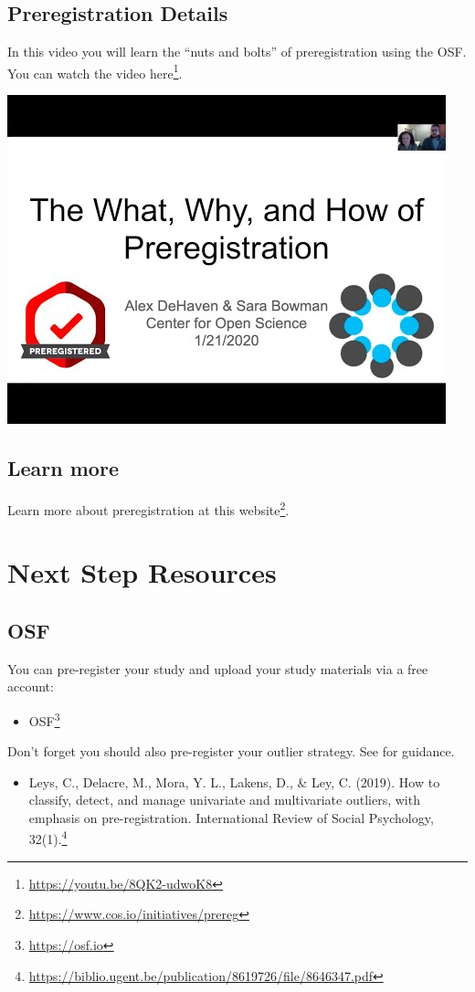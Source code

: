 \documentclass[
]{krantz}
\providecommand{\tightlist}{%
  \setlength{\itemsep}{0pt}\setlength{\parskip}{0pt}}
\renewcommand{\href}[2]{#2\footnote{\url{#1}}}
\begin{document}
\hypertarget{preregistration-details}{%
\section{Preregistration Details}\label{preregistration-details}}

In this video you will learn the ``nuts and bolts'' of preregistration using the OSF. You can watch the video \href{https://youtu.be/8QK2-udwoK8}{here}.

\includegraphics[width=0.4\linewidth]{ch_preregistration/images/prereg_details}

\hypertarget{learn-more}{%
\section{Learn more}\label{learn-more}}

Learn more about preregistration at this \href{https://www.cos.io/initiatives/prereg}{website}.

\hypertarget{next-step-resources}{%
\chapter{Next Step Resources}\label{next-step-resources}}

\hypertarget{osf}{%
\section{OSF}\label{osf}}

You can pre-register your study and upload your study materials via a free account:

\begin{itemize}
\tightlist
\item
  \href{https://osf.io}{OSF}
\end{itemize}

Don't forget you should also pre-register your outlier strategy. See \citep{leys2019classify} for guidance.

\begin{itemize}
\tightlist
\item
  \href{https://biblio.ugent.be/publication/8619726/file/8646347.pdf}{Leys, C., Delacre, M., Mora, Y. L., Lakens, D., \& Ley, C. (2019). How to classify, detect, and manage univariate and multivariate outliers, with emphasis on pre-registration. International Review of Social Psychology, 32(1).}
\end{itemize}
\end{document}
